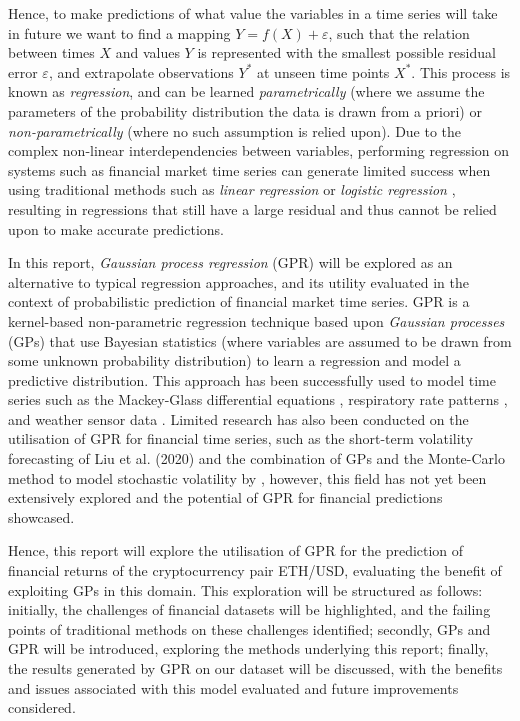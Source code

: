 \documentclass[a4paper, 11pt]{article}
\begin{document}
    Hence, to make predictions of what value the variables in a time series will take in future we want to find a mapping $Y = f(X) + \varepsilon$, such that the relation between times $X$ and values $Y$ is represented with the smallest possible residual error $\varepsilon$, and extrapolate observations $Y^*$ at unseen time points $X^*$. This process is known as \emph{regression}, and can be learned \emph{parametrically} (where we assume the parameters of the probability distribution the data is drawn from a priori) or \emph{non-parametrically} (where no such assumption is relied upon). Due to the complex non-linear interdependencies between variables, performing regression on systems such as financial market time series can generate limited success when using traditional methods such as \emph{linear regression} \cite{lin-2007} or \emph{logistic regression} \cite{baidoo-2016}, resulting in regressions that still have a large residual and thus cannot be relied upon to make accurate predictions. 

    In this report, \emph{Gaussian process regression} (GPR) will be explored as an alternative to typical regression approaches, and its utility evaluated in the context of probabilistic prediction of financial market time series. GPR is a kernel-based non-parametric regression technique based upon \emph{Gaussian processes} (GPs) that use Bayesian statistics (where variables are assumed to be drawn from some unknown probability distribution) to learn a regression and model a predictive distribution. This approach has been successfully used to model time series such as the Mackey-Glass differential equations \cite{girard-2002}, respiratory rate patterns \cite{bermak-2004}, and weather sensor data \cite{roberts-2013}. Limited research has also been conducted on the utilisation of GPR for financial time series, such as the short-term volatility forecasting of Liu et al. (2020) and the combination of GPs and the Monte-Carlo method to model stochastic volatility by , however, this field has not yet been extensively explored and the potential of GPR for financial predictions showcased. 

    Hence, this report will explore the utilisation of GPR for the prediction of financial returns of the cryptocurrency pair ETH/USD, evaluating the benefit of exploiting GPs in this domain. This exploration will be structured as follows: initially, the challenges of financial datasets will be highlighted, and the failing points of traditional methods on these challenges identified; secondly, GPs and GPR will be introduced, exploring the methods underlying this report; finally, the results generated by GPR on our dataset will be discussed, with the benefits and issues associated with this model evaluated and future improvements considered. 
\end{document}
